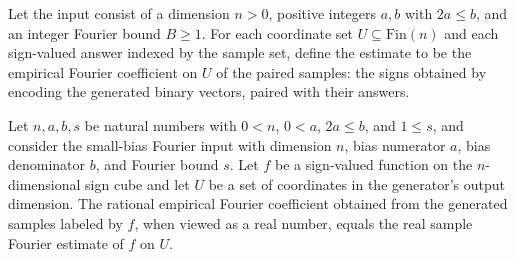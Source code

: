 \begin{definition}
\label{FABL.rationalSmallBiasFourierEstimate}
\leanok
{}
Let the input consist of a dimension $n>0$, positive integers $a,b$ with $2a\le b$, and
an integer Fourier bound $B\ge1$. For each coordinate set $U\subseteq\mathrm{Fin}(n)$
and each sign-valued answer indexed by the sample set, define the estimate to be the
empirical Fourier coefficient on $U$ of the paired samples: the signs obtained by
encoding the generated binary vectors, paired with their answers.
\end{definition}

\begin{theorem}
\label{FABL.rationalSmallBiasFourierEstimate_cast}
\leanok
{}
Let $n,a,b,s$ be natural numbers with $0<n$, $0<a$, $2a\le b$, and $1\le s$, and
consider the small-bias Fourier input with dimension $n$, bias numerator $a$, bias
denominator $b$, and Fourier bound $s$. Let $f$ be a sign-valued function on the
$n$-dimensional sign cube and let $U$ be a set of coordinates in the generator's output
dimension. The rational empirical Fourier coefficient obtained from the generated
samples labeled by $f$, when viewed as a real number, equals the real sample Fourier
estimate of $f$ on $U$.
\end{theorem}


